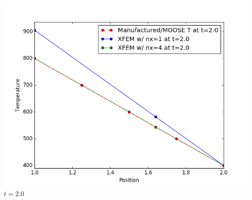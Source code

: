 \documentclass[]{beamer}
\begin{document}
\begin{frame}[t]
\begin{columns}
\begin{center}
			\includegraphics[scale=0.17]{figures/1D_rz_h1m/1D_rz_homog1mat_u_vs_x_20}\\
			$t=2.0$
			\end{center}
	\end{columns}
\end{frame}
\end{document}
